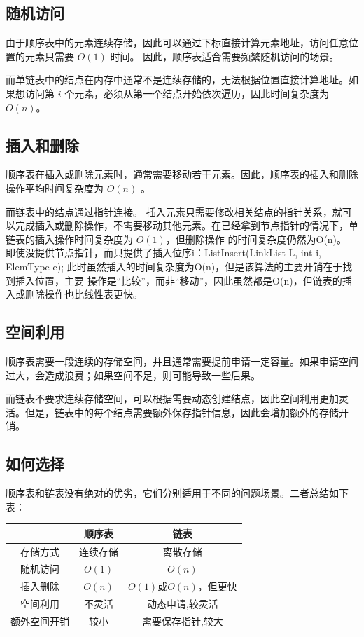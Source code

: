 \subsection{随机访问}
由于顺序表中的元素连续存储，因此可以通过下标直接计算元素地址，访问任意位置的元素只需要 $O(1)$ 时间。
因此，顺序表适合需要频繁随机访问的场景。

而单链表中的结点在内存中通常不是连续存储的，无法根据位置直接计算地址。如果想访问第 $i$ 个元素，必须从第一个结点开始依次遍历，因此时间复杂度为 $O(n)$。
\subsection{插入和删除}
\label{subsec:插入和删除}
顺序表在插入或删除元素时，通常需要移动若干元素。因此，顺序表的插入和删除操作平均时间复杂度为 $O(n)$ 。


而链表中的结点通过指针连接。
插入元素只需要修改相关结点的指针关系，就可以完成插入或删除操作，不需要移动其他元素。在已经拿到节点指针的情况下，单链表的插入操作时间复杂度为 $O(1)$，但删除操作
的时间复杂度仍然为O(n)。
即使没提供节点指针，而只提供了插入位序i：ListInsert(LinkList L, int i, ElemType e); 此时虽然插入的时间复杂度为O(n)，但是该算法的主要开销在于找到插入位置，主要
操作是“比较”，而非“移动”，因此虽然都是O(n)，但链表的插入或删除操作也比线性表更快。


\subsection{空间利用}
顺序表需要一段连续的存储空间，并且通常需要提前申请一定容量。如果申请空间过大，会造成浪费；如果空间不足，则可能导致一些后果。

而链表不要求连续存储空间，可以根据需要动态创建结点，因此空间利用更加灵活。但是，链表中的每个结点需要额外保存指针信息，因此会增加额外的存储开销。


\subsection{如何选择}
顺序表和链表没有绝对的优劣，它们分别适用于不同的问题场景。二者总结如下表：

\begin{center}
\begin{tabular}{c|c|c}
 & 顺序表 & 链表 \\
\hline
存储方式 & 连续存储 & 离散存储 \\
随机访问 & $O(1)$ & $O(n)$ \\
插入删除 & $O(n)$ & $O(1)$或$O(n)$，但更快\\
空间利用 & 不灵活 & 动态申请,较灵活 \\
额外空间开销 & 较小 & 需要保存指针,较大 \\
\end{tabular}
\end{center}

